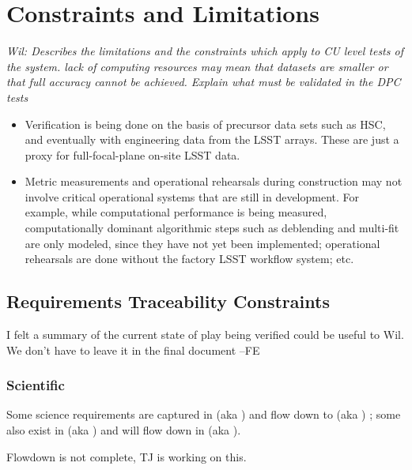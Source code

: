 \section{Constraints and Limitations}

\textit{Wil: Describes the limitations and the constraints which apply to CU level tests of the system. lack of computing resources may mean that datasets are smaller or that full accuracy cannot be achieved. Explain what must be validated in the DPC tests}

\begin{itemize}

\item Verification is being done on the basis of precursor data sets such as HSC, and eventually with engineering data from the LSST arrays. These are just a proxy for full-focal-plane on-site LSST data.

\item Metric measurements and operational rehearsals during construction may not involve critical operational systems that are still in development. For example, while computational performance is being measured, computationally dominant algorithmic steps such as deblending and multi-fit are only modeled, since they have not yet been implemented; operational rehearsals are done without the factory LSST workflow system; etc.

\end{itemize}

\subsection{Requirements Traceability Constraints}

\begin{note}
  I felt a summary of the current state of play being verified could be useful to Wil. We don't have to leave it in the final document --FE
\end{note}

\subsubsection{Scientific}

Some science requirements are captured in  (aka \LSR) and  flow down to  (aka \OSS) ; some also exist in  (aka \DPDD) and will flow down in  (aka \DMSR).

\begin{note}
Flowdown is not complete, TJ is working on this.
\end{note}

